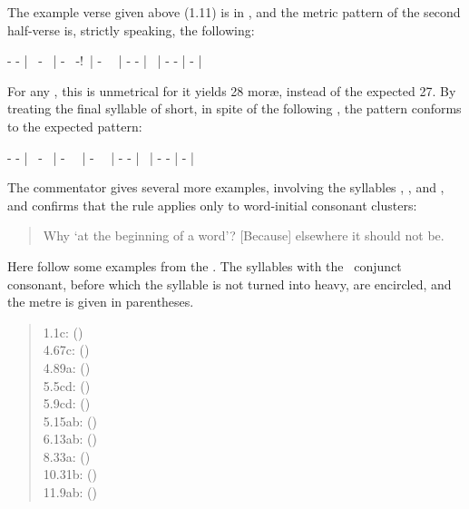 \noindent
The example verse given above (1.11) is in , and the
metric pattern of the second half-verse is, strictly speaking, the following:
 
- - | \shortsyllable\ - \shortsyllable\ | - \shortsyllable\ -!~| 
- \shortsyllable\ \shortsyllable\ | 
- - | \shortsyllable\ | -  - | - |

\noindent
For any , this is unmetrical for it yields 28 mor\ae, instead
of the expected 27. By treating the final syllable of  short, 
in spite of the following , the pattern conforms 
to the expected pattern: 

- - | \shortsyllable\ - \shortsyllable\ | 
- \shortsyllable\ \shortsyllable\ | - \shortsyllable\ \shortsyllable\ | - - | 
\shortsyllable\ | - - | - |

\noindent
The commentator gives several more examples, involving the syllables
, , and , and confirms that the rule
applies only to word-initial consonant clusters: 

\begin{quote}
{\footnotesize{}

Why `at the beginning of a word'? [Because] elsewhere it should not be.}
\end{quote}

\noindent
Here follow some examples from the \VSS. The syllables 
with the \krama\ conjunct consonant, before which the syllable
is not turned into heavy, are encircled, and the metre is given in 
parentheses.

\begin{quote}	
1.1c:  ()\\
4.67c:  ()\\
4.89a:  ()\\
5.5cd:  ()\\
5.9cd:   ()\\
5.15ab:  ()\\
6.13ab:  ()\\
8.33a:  
 ()\\
10.31b:  ()\\
11.9ab:  ()
\end{quote}

